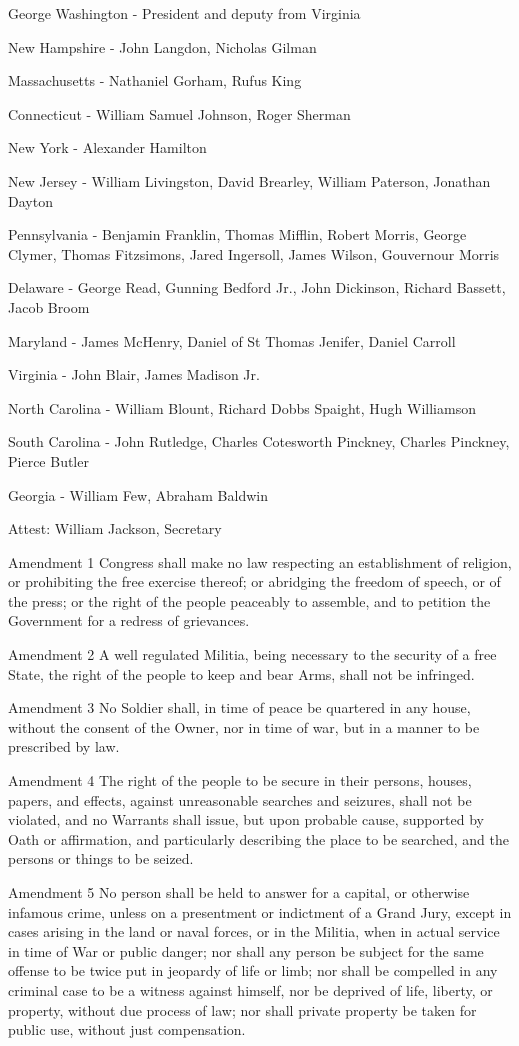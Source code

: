 \documentclass[12pt,a4paper]{article}
\begin{document}
George Washington - President and deputy from Virginia

New Hampshire - John Langdon, Nicholas Gilman

Massachusetts - Nathaniel Gorham, Rufus King

Connecticut - William Samuel Johnson, Roger Sherman

New York - Alexander Hamilton

New Jersey - William Livingston, David Brearley, William Paterson, Jonathan
Dayton

Pennsylvania - Benjamin Franklin, Thomas Mifflin, Robert Morris, George Clymer,
Thomas Fitzsimons, Jared Ingersoll, James Wilson, Gouvernour Morris

Delaware - George Read, Gunning Bedford Jr., John Dickinson, Richard Bassett,
Jacob Broom

Maryland - James McHenry, Daniel of St Thomas Jenifer, Daniel Carroll

Virginia - John Blair, James Madison Jr.

North Carolina - William Blount, Richard Dobbs Spaight, Hugh Williamson

South Carolina - John Rutledge, Charles Cotesworth Pinckney, Charles Pinckney,
Pierce Butler

Georgia - William Few, Abraham Baldwin

Attest: William Jackson, Secretary


Amendment 1
Congress shall make no law respecting an establishment of religion, or
prohibiting the free exercise thereof; or abridging the freedom of speech, or
of the press; or the right of the people peaceably to assemble, and to petition
the Government for a redress of grievances.

Amendment 2
A well regulated Militia, being necessary to the security of a free State, the
right of the people to keep and bear Arms, shall not be infringed.

Amendment 3
No Soldier shall, in time of peace be quartered in any house, without the
consent of the Owner, nor in time of war, but in a manner to be prescribed by
law.

Amendment 4
The right of the people to be secure in their persons, houses, papers, and
effects, against unreasonable searches and seizures, shall not be violated, and
no Warrants shall issue, but upon probable cause, supported by Oath or
affirmation, and particularly describing the place to be searched, and the
persons or things to be seized.

Amendment 5
No person shall be held to answer for a capital, or otherwise infamous crime,
unless on a presentment or indictment of a Grand Jury, except in cases arising
in the land or naval forces, or in the Militia, when in actual service in time
of War or public danger; nor shall any person be subject for the same offense
to be twice put in jeopardy of life or limb; nor shall be compelled in any
criminal case to be a witness against himself, nor be deprived of life,
liberty, or property, without due process of law; nor shall private property be
taken for public use, without just compensation.
\end{document}
